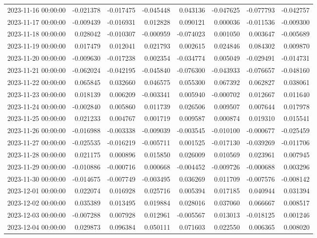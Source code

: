 \begin{tabular}{lrrrrrrr}
2023-11-16 00:00:00 & -0.021378 & -0.017475 & -0.045448 & 0.043136 & -0.047625 & -0.077793 & -0.042757 \\
2023-11-17 00:00:00 & -0.009439 & -0.016931 & 0.012828 & 0.090121 & 0.000036 & -0.011536 & -0.009300 \\
2023-11-18 00:00:00 & 0.028042 & -0.010307 & -0.000959 & -0.074023 & 0.001050 & 0.003647 & -0.005689 \\
2023-11-19 00:00:00 & 0.017479 & 0.012041 & 0.021793 & 0.002615 & 0.024846 & 0.084302 & 0.009870 \\
2023-11-20 00:00:00 & -0.009630 & -0.017238 & 0.002354 & -0.034774 & 0.005049 & -0.029491 & -0.014731 \\
2023-11-21 00:00:00 & -0.062024 & -0.042195 & -0.045840 & -0.076300 & -0.043933 & -0.076657 & -0.048160 \\
2023-11-22 00:00:00 & 0.065845 & 0.032660 & 0.046575 & 0.055300 & 0.067392 & 0.062827 & 0.038061 \\
2023-11-23 00:00:00 & 0.018139 & 0.006209 & -0.003341 & 0.005940 & -0.000702 & 0.012667 & 0.011640 \\
2023-11-24 00:00:00 & -0.002840 & 0.005860 & 0.011739 & 0.026506 & 0.009507 & 0.007644 & 0.017978 \\
2023-11-25 00:00:00 & 0.021233 & 0.004767 & 0.001719 & 0.009587 & 0.000874 & 0.019310 & 0.015541 \\
2023-11-26 00:00:00 & -0.016988 & -0.003338 & -0.009039 & -0.003545 & -0.010100 & -0.000677 & -0.025459 \\
2023-11-27 00:00:00 & -0.025535 & -0.016219 & -0.005711 & 0.001525 & -0.017130 & -0.039269 & -0.011706 \\
2023-11-28 00:00:00 & 0.021175 & 0.000896 & 0.015850 & 0.026009 & 0.010569 & 0.023961 & 0.007945 \\
2023-11-29 00:00:00 & -0.010886 & -0.000716 & 0.000668 & -0.004452 & -0.009726 & -0.000688 & 0.003296 \\
2023-11-30 00:00:00 & -0.014675 & -0.007749 & -0.003495 & 0.036269 & 0.011709 & -0.007576 & -0.008142 \\
2023-12-01 00:00:00 & 0.022074 & 0.016928 & 0.025716 & 0.005394 & 0.017185 & 0.040944 & 0.031394 \\
2023-12-02 00:00:00 & 0.035389 & 0.013495 & 0.019884 & 0.028016 & 0.037060 & 0.066667 & 0.008517 \\
2023-12-03 00:00:00 & -0.007288 & 0.007928 & 0.012961 & -0.005567 & 0.013013 & -0.018125 & 0.001246 \\
2023-12-04 00:00:00 & 0.029873 & 0.096384 & 0.050111 & 0.071603 & 0.022550 & 0.006365 & 0.008020 \\

\end{tabular}
